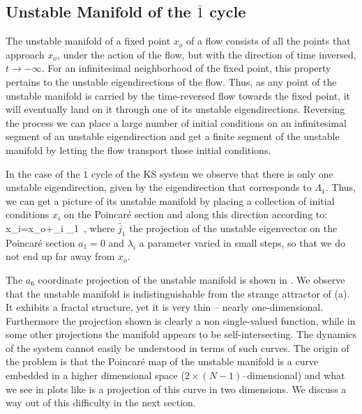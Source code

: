 \documentclass[pre,preprint,groupedaddress,showpacs,showkeys]{revtex4}
\begin{document}
\subsection{Unstable Manifold of the $ \overline{1}$   cycle \label{sec:UnstableManifold}}

 The unstable manifold of a fixed point $x_o$ of a flow consists of all the
 points that approach $x_o$, under the action of the flow, but with the
 direction of time inversed, $t\rightarrow -\infty$. For an infinitesimal neighborhood of the
 fixed point, this property pertains to the unstable eigendirections of the
 flow. Thus, as any point of the unstable manifold is carried by the
 time-reversed flow towards the fixed point, it will eventually land
 on it through one of its unstable eigendirections. Reversing the
 process we can place a large number of initial conditions on an
 infinitesimal segment of an unstable eigendirection and get a finite
 segment of the unstable manifold by letting the flow transport those
 initial conditions.

 In the case of the  $ \overline{1}$ cycle of the KS system we observe
 that there is only one unstable eigendirection, given by the
 eigendirection that corresponds to $\Lambda_1$. Thus, we can get a
 picture of its unstable manifold by placing a collection of
 initial conditions $x_i$ on the Poincar\'e section and along
 this direction according to:
 \beq
  x_i=x_o+\lambda_i _1\, ,
  \label{eq:unstable initialization}
 \eeq
 where $\hat{j}_1$ the projection of the unstable eigenvector on the
 Poincar\'e section $a_1=0$ and $\lambda_i$ a
 parameter varied in small steps, so that we do not end up far away
 from $x_o$.

 The $a_6$ coordinate projection of the
 unstable manifold is shown in .
 We observe that the unstable manifold is indistinguishable from the
 strange attractor of (a). It exhibits a fractal structure, yet it is very thin -- nearly
 one-dimensional. Furthermore the projection shown is clearly
 a non single-valued function, while in some other projections
 the manifold appears to be self-intersecting. The dynamics of the system cannot easily be
 understood in terms of such curves. The origin of the problem is that
 the Poincar\'e map of the unstable manifold is a curve embedded in a
 higher dimensional space  ($ 2\times(N-1)$--dimensional) and what we see in plots like
  is a projection of this curve in two
 dimensions. We discuss a way out of this difficulty in the
 next section.
\end{document}
